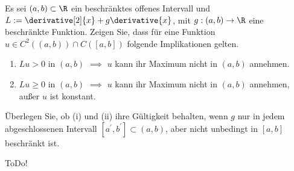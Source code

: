 
\begin{exercise}

Es sei $(a, b) \subset \R$ ein beschränktes offenes Intervall und $L := \derivative[2]{x} + g \derivative{x}$, mit $g: (a, b) \to \R$ eine beschränkte Funktion.
Zeigen Sie, dass für eine Funktion $u \in C^2((a, b)) \cap C([a, b])$ folgende Implikationen gelten.

\begin{enumerate}[label = (\roman*)]
    \item $Lu > 0$ in $(a, b)$ $\implies$ $u$ kann ihr Maximum nicht in $(a, b)$ annehmen.
    \item $Lu \geq 0$ in $(a, b)$ $\implies$ $u$ kann ihr Maximum nicht in $(a, b)$ annehmen, außer $u$ ist konstant.
\end{enumerate}

Überlegen Sie, ob (i) und (ii) ihre Gültigkeit behalten, wenn $g$ nur in jedem abgeschlossenen Intervall $[a^\prime, b^\prime] \subset (a, b)$, aber nicht unbedingt in $[a, b]$ beschränkt ist.

\end{exercise}


\begin{solution}

ToDo!

\end{solution}

